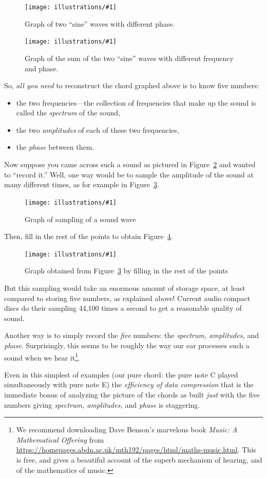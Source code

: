 \documentclass[openany]{book}
\newcommand{\ill}[3]{%
   \begin{figure}[H]%
   \vspace{-2ex}
   \centering%
   \texttt{[image: illustrations/\#1]}%
   \caption{#3}%
   \vspace{-2ex}
    \end{figure}}
\theoremstyle{plain}
\theoremstyle{definition}
\begin{document}
{\ill{sin-twofreq-phase}{.6}{\label{fig:sin-twofreq-phase}Graph of two ``sine'' waves with different phase.}

\ill{sin-twofreq-phase-sum}{.6}{Graph of the sum of the two ``sine'' waves with different frequency
and phase.\label{fig:sum-sin-phase}}


  So, {\em all you need} to reconstruct the chord graphed above is to
  know five numbers:
  \begin{itemize}
  \item the two frequencies---the collection of frequencies that make
    up the sound is called the {\em spectrum} of the sound,
  \item the two {\em amplitudes} of each of these two frequencies,
  \item the {\em phase} between them.

 \end{itemize}

 Now suppose you came across such a sound as pictured in
 Figure~\ref{fig:sum-sin-phase} and wanted to ``record it.''  Well,
 one way would be to sample the amplitude of the sound at many
 different times, as for example in Figure~\ref{fig:sum-sin-phase-sample}.

\ill{sin-twofreq-phase-sum-points}{.6}{Graph of sampling of a sound wave\label{fig:sum-sin-phase-sample}}

Then, fill in the rest of the points to obtain Figure~\ref{fig:sum-sin-phase-sample-fill}.

\ill{sin-twofreq-phase-sum-fill}{0.6}{Graph obtained from Figure~\ref{fig:sum-sin-phase-sample} by
filling in the rest of the points\label{fig:sum-sin-phase-sample-fill}}

But this sampling would take an enormous amount of storage space, at
least compared to storing five numbers, as explained above!
Current audio compact discs do their sampling 44,100 times a second to
get a reasonable quality of sound.

Another way is to simply record the {\em five} numbers: the {\em
  spectrum, amplitudes,} and {\em phase}.  Surprisingly, this seems to
be roughly the way our ear processes such a sound when we hear it\footnote{%
We recommend downloading Dave Benson's marvelous book
{\em Music: A Mathematical Offering} from
\url{https://homepages.abdn.ac.uk/mth192/pages/html/maths-music.html}.
This is free, and gives a beautiful account of the superb
mechanism of hearing, and of the mathematics of music.}.

  Even in this simplest of examples (our pure chord: the pure note C
  played simultaneously with pure note E) the {\em efficiency of data
    compression} that is the immediate bonus of analyzing the picture
  of the chords as built {\em just} with the five numbers giving {\em
    spectrum, amplitudes,} and {\em phase} is staggering.

}
\end{document}
